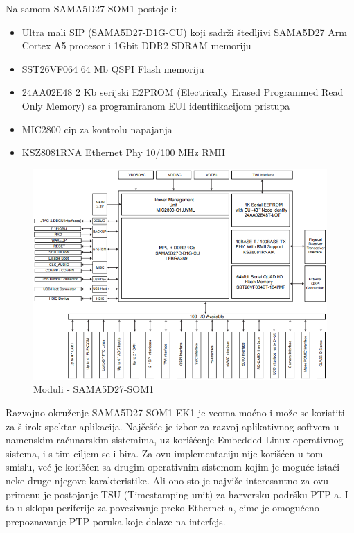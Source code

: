 \documentclass[a4paper,12pt, master]{etf}
\begin{document}
	Na samom SAMA5D27-SOM1 postoje i:
	\begin{itemize}
		\item Ultra mali SIP (SAMA5D27-D1G-CU) koji sadr\v{z}i \v{s}tedljivi SAMA5D27 Arm Cortex 
		A5 procesor i 1Gbit DDR2 SDRAM memoriju
		\item SST26VF064 64 Mb QSPI Flash memoriju
		\item 24AA02E48 2 Kb serijski E2PROM (Electrically Erased Programmed Read Only Memory) 
		sa programiranom EUI identifikacijom pristupa
		\item MIC2800 cip za kontrolu napajanja
		\item KSZ8081RNA Ethernet Phy 10/100 MHz RMII
	\end{itemize}

	\begin{figure}[htb]
		\centering
		\includegraphics[scale=.7]{../pic/hw_som_modules.PNG}
		\caption{Moduli - SAMA5D27-SOM1}
		\label{fig:hw_som_modules}
	\end{figure}

	Razvojno okru\v{z}enje SAMA5D27-SOM1-EK1 je veoma mo\'{c}no i mo\v{z}e se koristiti za \v{s}
	irok spektar aplikacija. Naj\v{c}e\v{s}\'{c}e je izbor za razvoj aplikativnog softvera u 
	namenskim ra\v{c}unarskim sistemima, uz kori\v{s}\'{c}enje Embedded Linux operativnog 
	sistema, i s tim ciljem se i bira. Za ovu implementaciju nije kori\v{s}\'{c}en u tom smislu, 
	ve\'{c} je kori\v{s}\'{c}en sa drugim operativnim sistemom kojim je mogu\'{c}e ista\'{c}i 
	neke druge njegove karakteristike. Ali ono sto je najvi\v{s}e interesantno za ovu primenu je 
	postojanje TSU (Timestamping unit) za harversku podr\v{s}ku PTP-a. I to u sklopu periferije 
	za povezivanje preko Ethernet-a, cime je omogu\'{c}eno prepoznavanje PTP poruka koje dolaze 
	na interfejs.
\end{document}
